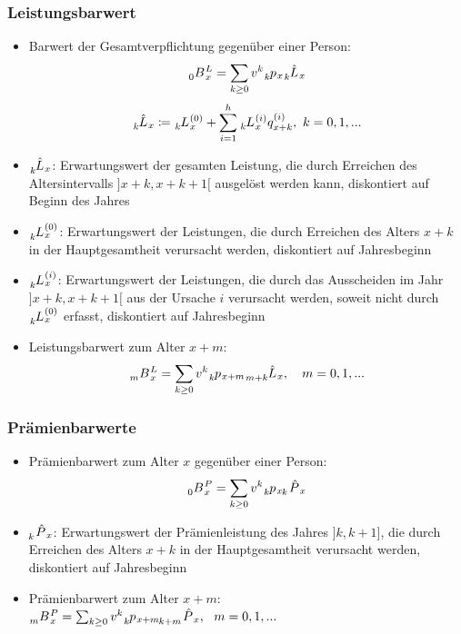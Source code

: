 \documentclass[12pt]{report}
\theoremstyle{dotless}
\theoremstyle{definition}
\begin{document}
\subsubsection{Leistungsbarwert}
\begin{itemize}
	\item Barwert der Gesamtverpflichtung gegenüber einer Person: 
	\begin{equation}
		\tensor[_{0}]{B}{}_x^{L}= \sum_{k\geq 0}v^k \tensor[_{k}]{p}{}_x \tensor[_{k}]{\hat{L}}{}_x
	\end{equation}
	\begin{equation}
		\tensor[_{k}]{\hat{L}}{}_x \coloneqq	\tensor[_{k}]{L}{}_x^{(0)}+\sum_{i=1}^h \tensor[_{k}]{L}{}_x^{(i)}q_{x+k}^{(i)}, \ k = 0,1,...
	\end{equation}
	\item $\tensor[_{k}]{\hat{L}}{}_x$: Erwartungswert der gesamten Leistung, die durch Erreichen des Altersintervalls $]x+k,x+k+1[$ ausgelöst werden kann, diskontiert auf Beginn des Jahres
	\item $\tensor[_{k}]{L}{}_x^{(0)}$: Erwartungswert der Leistungen, die durch Erreichen des Alters $x+k$ in der Hauptgesamtheit verursacht werden, diskontiert auf Jahresbeginn
	\item $\tensor[_{k}]{L}{}_x^{(i)}$: Erwartungswert der Leistungen, die durch das Ausscheiden im Jahr $]x+k, x+k+1[$ aus der Ursache $i$ verursacht werden, soweit nicht durch $\tensor[_{k}]{L}{}_x^{(0)}$ erfasst, diskontiert auf Jahresbeginn
	\item Leistungsbarwert zum Alter $x+m$:
	\begin{equation}
		\tensor[_{m}]{B}{}_x^{L}=\sum_{k\geq0}v^k \tensor[_{k}]{p}{}_{x+m} \tensor[_{m+k}]{\hat{L}}{}_x, \ \ \  m=0,1,...
	\end{equation}
\end{itemize}

\subsubsection{Prämienbarwerte}
\begin{itemize}
	\item Prämienbarwert zum Alter $x$ gegenüber einer Person:
	\begin{equation}
		\tensor[_{0}]{B}{}_x^{P} = \sum_{k \geq 0} v^k \tensor[_{k}]{p}{}_x \tensor[_{k}]{\hat{P}}{}_x
	\end{equation}
	\item $\tensor[_{k}]{\hat{P}}{}_x$: Erwartungswert der Prämienleistung des Jahres $]k,k+1]$, die durch Erreichen des Alters $x+k$ in der Hauptgesamtheit verursacht werden, diskontiert auf Jahresbeginn
	\item Prämienbarwert zum Alter $x+m$: $\tensor[_{m}]{B}{}_x^P = \sum_{k \geq 0}v^k \tensor[_{k}]{p}{}_{x+m} \tensor[_{k+m}]{\hat{P}}{}_x, \ \ m =0,1,...$
\end{itemize}
\end{document}
